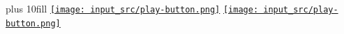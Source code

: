 \documentclass[C++.tex]{subfiles}
\begin{document}
\begin{frame}[fragile]
	\vskip 10mm plus 10fill
	\hfill
	\href{https://godbolt.org/#g:!((g:!((g:!((h:codeEditor,i:(filename:'1',fontScale:14,fontUsePx:'0',j:1,lang:c%2B%2B,selection:(endColumn:1,endLineNumber:21,positionColumn:1,positionLineNumber:21,selectionStartColumn:1,selectionStartLineNumber:21,startColumn:1,startLineNumber:21),source:'%23include+%3Ciostream%3E%0A%23include+%3Cstring%3E%0A%0Astruct+Foo+final%0A%7B%0A++Foo()%0A++%7B%0A++%7D%0A%7D%3B%0A%0Astruct+Bar+:+Foo%0A%7B%0A++Bar()%0A++%7B%0A++%7D%0A%7D%3B%0A%0Aint+main()%0A%7B%0A%7D%0A'),l:'5',n:'0',o:'C%2B%2B+source+%231',t:'0')),k:50,l:'4',n:'0',o:'',s:0,t:'0'),(g:!((h:executor,i:(argsPanelShown:'1',compilationPanelShown:'0',compiler:g112,compilerOutShown:'0',execArgs:'',execStdin:'',fontScale:14,fontUsePx:'0',j:1,lang:c%2B%2B,libs:!((name:boost,ver:'175')),options:'-std%3Dc%2B%2B11',source:1,stdinPanelShown:'1',tree:'1',wrap:'0'),l:'5',n:'0',o:'Executor+x86-64+gcc+11.2+(C%2B%2B,+Editor+%231)',t:'0')),header:(),k:50,l:'4',n:'0',o:'',s:0,t:'0')),l:'2',n:'0',o:'',t:'0')),version:4}{\texttt{[image: input\_src/play-button.png]}}
	\href{https://godbolt.org/#g:!((g:!((g:!((h:codeEditor,i:(filename:'1',fontScale:14,fontUsePx:'0',j:1,lang:c%2B%2B,selection:(endColumn:1,endLineNumber:40,positionColumn:1,positionLineNumber:40,selectionStartColumn:1,selectionStartLineNumber:40,startColumn:1,startLineNumber:40),source:'%23include+%3Ciostream%3E%0A%23include+%3Cstring%3E%0A%0Astruct+Foo%0A%7B%0A++Foo()%0A++%7B%0A++%7D%0A%0A++virtual+void+f(int)%0A++%7B%0A++%7D%0A%7D%3B%0A%0Astruct+Bar+:+Foo%0A%7B%0A++Bar()%0A++%7B%0A++%7D%0A%0A++virtual+void+f(int)+final%0A++%7B%0A++%7D%0A%7D%3B%0A%0Astruct+Baz+:+Bar%0A%7B%0A++Baz()%0A++%7B%0A++%7D%0A%0A++virtual+void+f(int)%0A++%7B%0A++%7D%0A%7D%3B%0A%0Aint+main()%0A%7B%0A%7D%0A'),l:'5',n:'0',o:'C%2B%2B+source+%231',t:'0')),k:50,l:'4',n:'0',o:'',s:0,t:'0'),(g:!((h:executor,i:(argsPanelShown:'1',compilationPanelShown:'0',compiler:g112,compilerOutShown:'0',execArgs:'',execStdin:'',fontScale:14,fontUsePx:'0',j:1,lang:c%2B%2B,libs:!((name:boost,ver:'175')),options:'-std%3Dc%2B%2B11',source:1,stdinPanelShown:'1',tree:'1',wrap:'0'),l:'5',n:'0',o:'Executor+x86-64+gcc+11.2+(C%2B%2B,+Editor+%231)',t:'0')),header:(),k:50,l:'4',n:'0',o:'',s:0,t:'0')),l:'2',n:'0',o:'',t:'0')),version:4}{\texttt{[image: input\_src/play-button.png]}}
\end{frame}
\end{document}
